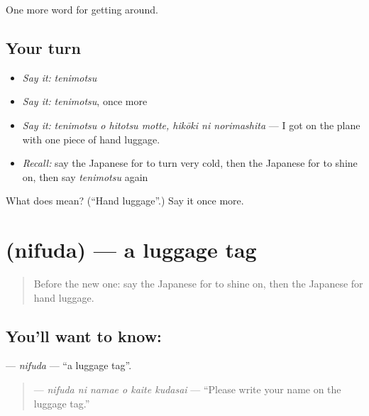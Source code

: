 \begin{grammarlens}[title={What you've built}]
One more word for getting around.
\end{grammarlens}

\subsection*{Your turn}
\begin{itemize}
\raggedright
  \item \emph{Say it:} \emph{tenimotsu}
  \item \emph{Say it:} \emph{tenimotsu}, once more
  \item \emph{Say it:} \emph{tenimotsu o hitotsu motte, hikōki ni norimashita} — I got on the plane with one piece of hand luggage.
  \item \emph{Recall:} say the Japanese for to turn very cold, then the Japanese for to shine on, then say \emph{tenimotsu} again
\end{itemize}

\begin{tcolorbox}[breakable,colback=teal!4,colframe=teal!35!black,title={Before you move on}]
What does  mean? (\textquotedblleft{}Hand luggage\textquotedblright{}.) Say it once more.
\end{tcolorbox}
\section[\texorpdfstring{\ja{にふだ} (nifuda)}{にふだ (nifuda)}]{ (nifuda) — a luggage tag}

\label{lesson:JA-C417-nifuda}



\begin{quote}
Before the new one: say the Japanese for to shine on, then the Japanese for hand luggage.
\end{quote}

\subsection*{You'll want to know: }
\textbf{} — \emph{nifuda} — \textquotedblleft{}a luggage tag\textquotedblright{}.

\begin{quote}
\textbf{   } — \emph{nifuda ni namae o kaite kudasai} — \textquotedblleft{}Please write your name on the luggage tag.\textquotedblright{}
\end{quote}

